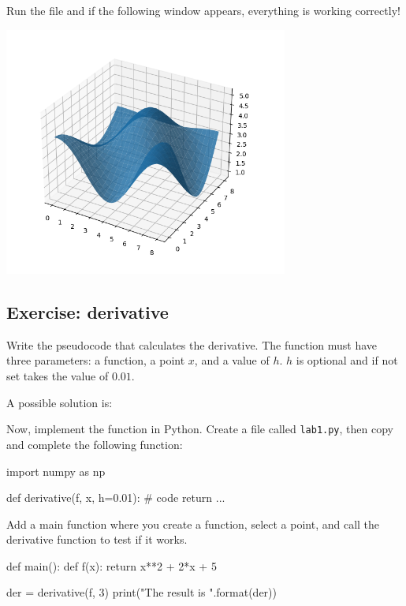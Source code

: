 Run the file and if the following window appears, everything is working correctly!
\begin{center}
    \includegraphics[width=0.7\textwidth]{content/optimization_problems/img/test.png}
\end{center}


\subsection{Exercise: derivative}

Write the pseudocode that calculates the derivative. The function must have three parameters: a function, a point \( x \), and a value of \( h \). \( h \) is optional and if not set takes the value of \( 0.01 \).

\DontPrintSemicolon    

A possible solution is:
\begin{algorithm}
\end{algorithm}

Now, implement the function in Python. Create a file called \texttt{lab1.py}, then copy and complete the following function:
\begin{python}
import numpy as np

def derivative(f, x, h=0.01):
    # code
    return ...
\end{python}

Add a main function where you create a function, select a point, and call the derivative function to test if it works.
\begin{python}
def main():
    def f(x):
        return x**2 + 2*x + 5
    
    der = derivative(f, 3)
    print("The result is {}".format(der))
\end{python}

